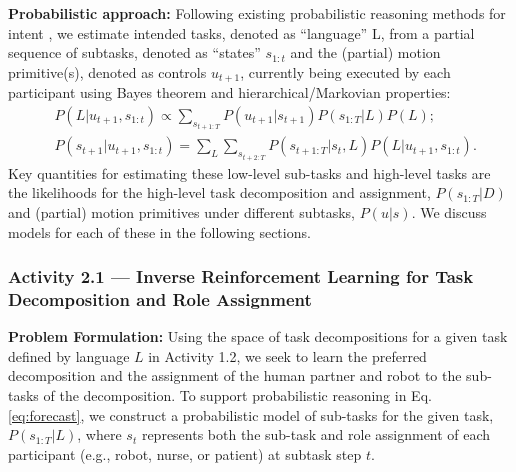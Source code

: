\documentclass[letterpaper, 11 pt, onecolumn]{article}
\begin{document}
\noindent
{\bf Probabilistic approach:}
Following existing probabilistic reasoning methods for intent \cite{wang2013probabilistic},
we estimate intended tasks, denoted as ``language'' L, from a partial sequence of subtasks, denoted as ``states'' $s_{1:t}$ and the (partial) motion primitive(s), denoted as controls $u_{t+1}$, currently being executed by each participant using Bayes theorem and hierarchical/Markovian properties:
\begin{align}
& P(L|u_{t+1}, s_{1:t}) \propto \sum_{s_{t+1:T}} P(u_{t+1}|s_{t+1}) P(s_{1:T}|L) P(L); \label{eq:forecast}\\
& P(s_{t+1}|u_{t+1}, s_{1:t}) =
\sum_{L}\sum_{s_{t+2:T}} P(s_{t+1:T}|s_t,L) P(L|u_{t+1}, s_{1:t}).
\end{align}
Key quantities for estimating these low-level sub-tasks and high-level tasks are 
the likelihoods for the high-level task decomposition and assignment, $P(s_{1:T}|D)$ and
(partial) motion primitives under different subtasks, $P(u|s)$.  We discuss models for each of these in the following sections.

\subsubsection{Activity 2.1 --- Inverse Reinforcement Learning for Task Decomposition and Role Assignment}\label{sec:plan-intent-Stackelberg}


\noindent
{\bf Problem Formulation:} Using the space of task decompositions for a given task defined by language $L$ in Activity 1.2, we seek to learn the preferred decomposition and the assignment of the human partner and robot to the sub-tasks of the decomposition.  To support probabilistic reasoning in Eq. \eqref{eq:forecast}, we construct a probabilistic model of sub-tasks for the given task, $P(s_{1:T}|L)$, where $s_t$ represents both the sub-task and role assignment of each participant (e.g., robot, nurse, or patient) at subtask step $t$.
\end{document}
